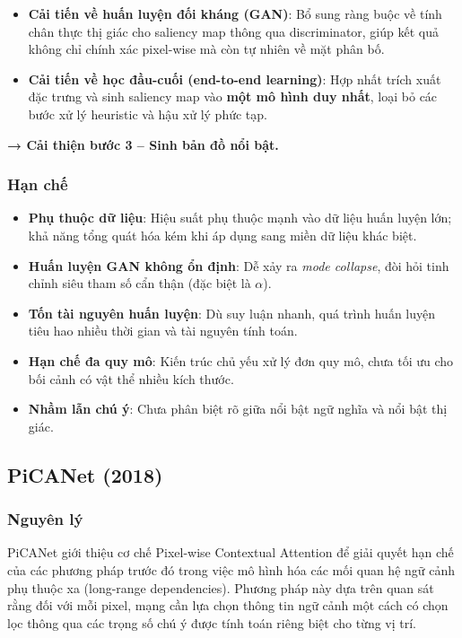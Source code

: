 \begin{itemize}
    \item \textbf{Cải tiến về huấn luyện đối kháng (GAN)}: Bổ sung ràng buộc về tính chân thực thị giác cho saliency map thông qua discriminator, giúp kết quả không chỉ chính xác pixel-wise mà còn tự nhiên về mặt phân bố.
    \item \textbf{Cải tiến về học đầu-cuối (end-to-end learning)}: Hợp nhất trích xuất đặc trưng và sinh saliency map vào \textbf{một mô hình duy nhất}, loại bỏ các bước xử lý heuristic và hậu xử lý phức tạp. 
\end{itemize}
\textbf{→ Cải thiện bước 3 – Sinh bản đồ nổi bật.}

\subsubsection{Hạn chế}
\begin{itemize}
    \item \textbf{Phụ thuộc dữ liệu}: Hiệu suất phụ thuộc mạnh vào dữ liệu huấn luyện lớn; khả năng tổng quát hóa kém khi áp dụng sang miền dữ liệu khác biệt.
    \item \textbf{Huấn luyện GAN không ổn định}: Dễ xảy ra \textit{mode collapse}, đòi hỏi tinh chỉnh siêu tham số cẩn thận (đặc biệt là $\alpha$).
    \item \textbf{Tốn tài nguyên huấn luyện}: Dù suy luận nhanh, quá trình huấn luyện tiêu hao nhiều thời gian và tài nguyên tính toán.
    \item \textbf{Hạn chế đa quy mô}: Kiến trúc chủ yếu xử lý đơn quy mô, chưa tối ưu cho bối cảnh có vật thể nhiều kích thước.
    \item \textbf{Nhầm lẫn chú ý}: Chưa phân biệt rõ giữa nổi bật ngữ nghĩa và nổi bật thị giác.
\end{itemize}

\newpage
\subsection{PiCANet (2018)}
\subsubsection{Nguyên lý}

PiCANet \cite{picanet_2018} giới thiệu cơ chế Pixel-wise Contextual Attention để giải quyết hạn chế của các phương pháp trước đó trong việc mô hình hóa các mối quan hệ ngữ cảnh phụ thuộc xa (long-range dependencies). Phương pháp này dựa trên quan sát rằng đối với mỗi pixel, mạng cần lựa chọn thông tin ngữ cảnh một cách có chọn lọc thông qua các trọng số chú ý được tính toán riêng biệt cho từng vị trí.

